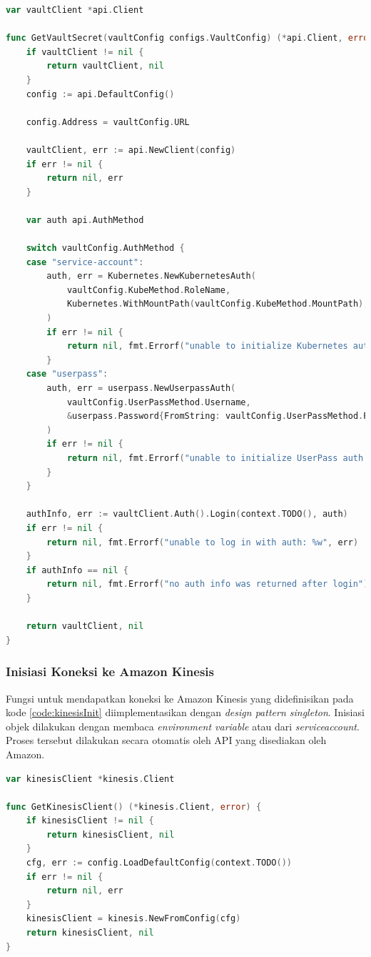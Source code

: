 \begin{lstlisting}[frame=single,language=Go,caption={Fungsi untuk inisiasi koneksi ke Vault},label={code:vaultInit}]
var vaultClient *api.Client

func GetVaultSecret(vaultConfig configs.VaultConfig) (*api.Client, error) {
	if vaultClient != nil {
		return vaultClient, nil
	}
	config := api.DefaultConfig()

	config.Address = vaultConfig.URL

	vaultClient, err := api.NewClient(config)
	if err != nil {
		return nil, err
	}

	var auth api.AuthMethod

	switch vaultConfig.AuthMethod {
	case "service-account":
		auth, err = Kubernetes.NewKubernetesAuth(
			vaultConfig.KubeMethod.RoleName,
			Kubernetes.WithMountPath(vaultConfig.KubeMethod.MountPath),
		)
		if err != nil {
			return nil, fmt.Errorf("unable to initialize Kubernetes auth method: %w", err)
		}
	case "userpass":
		auth, err = userpass.NewUserpassAuth(
			vaultConfig.UserPassMethod.Username,
			&userpass.Password{FromString: vaultConfig.UserPassMethod.Password},
		)
		if err != nil {
			return nil, fmt.Errorf("unable to initialize UserPass auth method: %w", err)
		}
	}

	authInfo, err := vaultClient.Auth().Login(context.TODO(), auth)
	if err != nil {
		return nil, fmt.Errorf("unable to log in with auth: %w", err)
	}
	if authInfo == nil {
		return nil, fmt.Errorf("no auth info was returned after login")
	}

	return vaultClient, nil
}
\end{lstlisting}

\subsubsection{Inisiasi Koneksi ke Amazon Kinesis}
\label{sec:initKinesis}

Fungsi untuk mendapatkan koneksi ke Amazon Kinesis yang didefinisikan pada kode \ref{code:kinesisInit} diimplementasikan dengan \textit{design pattern singleton}. Inisiasi objek dilakukan dengan membaca \textit{environment variable} atau dari \textit{serviceaccount}. Proses tersebut dilakukan secara otomatis oleh API yang disediakan oleh Amazon.

\begin{lstlisting}[frame=single,language=Go,caption={Fungsi untuk inisiasi Koneksi ke Amazon Kinesis},label={code:kinesisInit}]
var kinesisClient *kinesis.Client

func GetKinesisClient() (*kinesis.Client, error) {
	if kinesisClient != nil {
		return kinesisClient, nil
	}
	cfg, err := config.LoadDefaultConfig(context.TODO())
	if err != nil {
		return nil, err
	}
	kinesisClient = kinesis.NewFromConfig(cfg)
	return kinesisClient, nil
}
\end{lstlisting}

